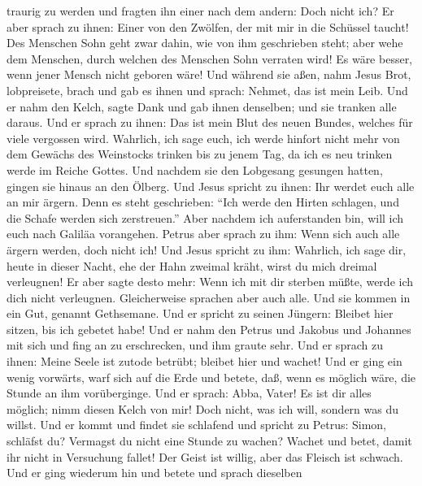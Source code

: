 traurig zu werden und fragten ihn einer nach dem andern: Doch nicht ich?
 Er aber sprach zu ihnen: Einer von den Zwölfen, der mit
mir in die Schüssel taucht!  Des Menschen Sohn geht zwar
dahin, wie von ihm geschrieben steht; aber wehe dem Menschen, durch
welchen des Menschen Sohn verraten wird! Es wäre besser, wenn jener
Mensch nicht geboren wäre!  Und während sie aßen, nahm
Jesus Brot, lobpreisete, brach und gab es ihnen und sprach: Nehmet, das
ist mein Leib.  Und er nahm den Kelch, sagte Dank und gab
ihnen denselben; und sie tranken alle daraus.  Und er
sprach zu ihnen: Das ist mein Blut des neuen Bundes, welches für viele
vergossen wird.  Wahrlich, ich sage euch, ich werde
hinfort nicht mehr von dem Gewächs des Weinstocks trinken bis zu jenem
Tag, da ich es neu trinken werde im Reiche Gottes.  Und
nachdem sie den Lobgesang gesungen hatten, gingen sie hinaus an den
Ölberg.  Und Jesus spricht zu ihnen: Ihr werdet euch alle
an mir ärgern. Denn es steht geschrieben: ``Ich werde den Hirten
schlagen, und die Schafe werden sich zerstreuen.''  Aber
nachdem ich auferstanden bin, will ich euch nach Galiläa vorangehen.
 Petrus aber sprach zu ihm: Wenn sich auch alle ärgern
werden, doch nicht ich!  Und Jesus spricht zu ihm:
Wahrlich, ich sage dir, heute in dieser Nacht, ehe der Hahn zweimal
kräht, wirst du mich dreimal verleugnen!  Er aber sagte
desto mehr: Wenn ich mit dir sterben müßte, werde ich dich nicht
verleugnen. Gleicherweise sprachen aber auch alle.  Und
sie kommen in ein Gut, genannt Gethsemane. Und er spricht zu seinen
Jüngern: Bleibet hier sitzen, bis ich gebetet habe!  Und
er nahm den Petrus und Jakobus und Johannes mit sich und fing an zu
erschrecken, und ihm graute sehr.  Und er sprach zu
ihnen: Meine Seele ist zutode betrübt; bleibet hier und wachet!
 Und er ging ein wenig vorwärts, warf sich auf die Erde
und betete, daß, wenn es möglich wäre, die Stunde an ihm vorüberginge.
 Und er sprach: Abba, Vater! Es ist dir alles möglich;
nimm diesen Kelch von mir! Doch nicht, was ich will, sondern was du
willst.  Und er kommt und findet sie schlafend und
spricht zu Petrus: Simon, schläfst du? Vermagst du nicht eine Stunde zu
wachen?  Wachet und betet, damit ihr nicht in Versuchung
fallet! Der Geist ist willig, aber das Fleisch ist schwach.
 Und er ging wiederum hin und betete und sprach dieselben
